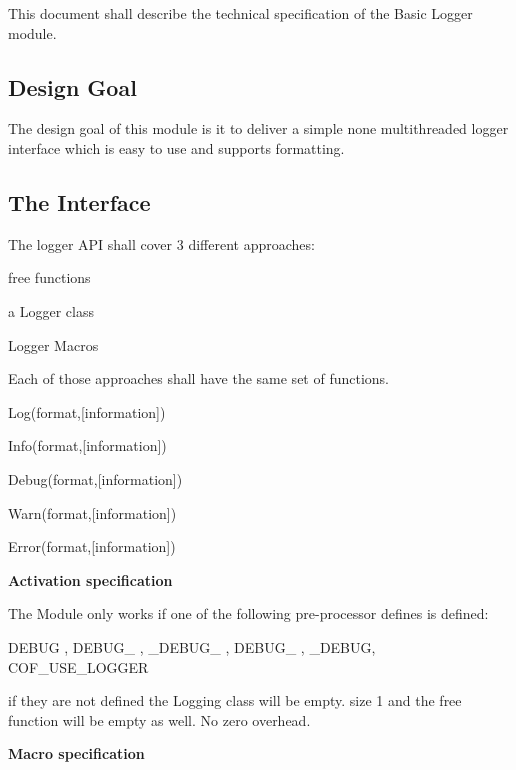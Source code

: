 This document shall describe the technical specification of the Basic Logger module.

\subsection*{Design Goal}

The design goal of this module is it to deliver a simple none multithreaded logger interface which is easy to use and supports formatting.

\subsection*{The Interface}

The logger A\+PI shall cover 3 different approaches\+:


\begin{DoxyItemize}
\item free functions
\item a {\ttfamily Logger} class
\item Logger Macros
\end{DoxyItemize}

Each of those approaches shall have the same set of functions.


\begin{DoxyItemize}
\item {\ttfamily Log(format,\mbox{[}information\mbox{]})}
\item {\ttfamily Info(format,\mbox{[}information\mbox{]})}
\item {\ttfamily Debug(format,\mbox{[}information\mbox{]})}
\item {\ttfamily Warn(format,\mbox{[}information\mbox{]})}
\item {\ttfamily Error(format,\mbox{[}information\mbox{]})}
\end{DoxyItemize}

{\bfseries Activation specification}

The Module only works if one of the following pre-\/processor defines is defined\+:

{\ttfamily D\+E\+B\+UG , D\+E\+B\+U\+G\+\_\+ , \+\_\+\+D\+E\+B\+U\+G\+\_\+ , D\+E\+B\+U\+G\+\_\+ , \+\_\+\+D\+E\+B\+UG, C\+O\+F\+\_\+\+U\+S\+E\+\_\+\+L\+O\+G\+G\+ER}

if they are not defined the Logging class will be empty. {\ttfamily size 1} and the free function will be empty as well. No zero overhead.

{\bfseries Macro specification}


